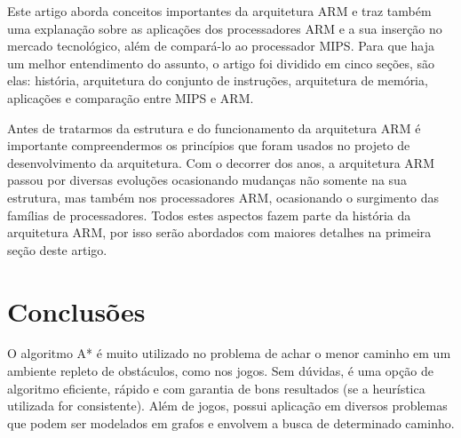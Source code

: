 \documentclass[12pt]{article}
\begin{document}
Este artigo aborda conceitos importantes da arquitetura ARM e traz também uma explanação sobre as aplicações dos processadores ARM e a sua inserção no mercado tecnológico, além de compará-lo ao processador MIPS. Para que haja um melhor entendimento do assunto, o artigo foi dividido em cinco seções, são elas: história, arquitetura do conjunto de instruções, arquitetura de memória, aplicações e comparação entre MIPS e ARM.

Antes de tratarmos da estrutura e do funcionamento da arquitetura ARM é importante compreendermos os princípios que foram usados no projeto de desenvolvimento da arquitetura. Com o decorrer dos anos, a arquitetura ARM passou por diversas evoluções ocasionando mudanças não somente na sua estrutura, mas também nos processadores ARM, ocasionando o surgimento das famílias de processadores. Todos estes aspectos fazem parte da história da arquitetura ARM, por isso serão abordados com maiores detalhes na primeira seção deste artigo.


\section{Conclusões}

O algoritmo A* é muito utilizado no problema de achar o menor caminho em um ambiente repleto de obstáculos, como nos jogos. Sem dúvidas, é uma opção de algoritmo eficiente, rápido e com garantia de bons resultados (se a heurística utilizada for consistente). Além de jogos, possui aplicação em diversos problemas que podem ser modelados em grafos e envolvem a busca de determinado caminho.



\end{document}
